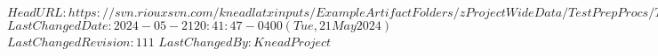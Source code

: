 \svnidlong
{$HeadURL: https://svn.riouxsvn.com/kneadlatxinputs/ExampleArtifactFolders/zProjectWideData/TestPrepProcs/TestPost_AllRecords.tex $}
{$LastChangedDate: 2024-05-21 20:41:47 -0400 (Tue, 21 May 2024) $}
{$LastChangedRevision: 111 $}
{$LastChangedBy: KneadProject $}



